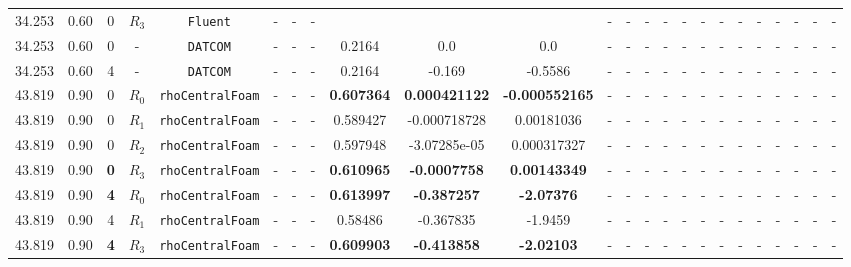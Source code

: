 \documentclass[12pt]{article}
\begin{document}
\begin{table}[H]
{\begin{tabular}{ccccc|ccc|ccc|ccc|ccc|ccccccc}
        \rowcolor{red!40}
        34.253 & 0.60 & 0 & $R_3$ & \texttt{Fluent} & - & - & - &  & &  & - & - & - & - & - & - & - & - & - & - & - & - & - \\ 
        \rowcolor{gray!10}
        34.253 & 0.60 & 0 & - & \texttt{DATCOM} & - & - & - & 0.2164 & 0.0 & 0.0 & - & - & - & - & - & - & - & - & - & - & - & - & - \\ 
        \rowcolor{gray!10}
        34.253 & 0.60 & 4 & - & \texttt{DATCOM} & - & - & - & 0.2164 & -0.169 & -0.5586 & - & - & - & - & - & - & - & - & - & - & - & - & - \\ \hline 
        \rowcolor{green!10}
        43.819 & 0.90 & 0 & $R_0$ & \texttt{rhoCentralFoam} & - & - & - & \textbf{0.607364} & \textbf{0.000421122} & \textbf{-0.000552165} & - & - & - & - & - & - & - & - & - & - & - & - & - \\ 
        \rowcolor{green!20}
        43.819 & 0.90 & 0 & $R_1$ & \texttt{rhoCentralFoam} & - & - & - & 0.589427 & -0.000718728 & 0.00181036 & - & - & - & - & - & - & - & - & - & - & - & - & - \\ 
        \rowcolor{green!30}
        43.819 & 0.90 & 0 & $R_2$ & \texttt{rhoCentralFoam} & - & - & - & 0.597948 & -3.07285e-05 & 0.000317327 & - & - & - & - & - & - & - & - & - & - & - & - & - \\ 
        \rowcolor{green!40}
        43.819 & 0.90 & \cellcolor{lime}\textbf{0} & \cellcolor{cyan}$R_3$ & \texttt{rhoCentralFoam} & - & - & - & \textbf{0.610965} & \textbf{-0.0007758} & \textbf{0.00143349} & - & - & - & - & - & - & - & - & - & - & - & - & - \\
        \rowcolor{green!10}
        43.819 & 0.90 & \textbf{4} & $R_0$ & \texttt{rhoCentralFoam} & - & - & - & \textbf{0.613997} & \textbf{-0.387257} & \textbf{-2.07376} & - & - & - & - & - & - & - & - & - & - & - & - & - \\
        \rowcolor{green!20}
        43.819 & 0.90 & 4 & $R_1$ & \texttt{rhoCentralFoam} & - & - & - & 0.58486 & -0.367835 & -1.9459 & - & - & - & - & - & - & - & - & - & - & - & - & - \\ 
        \rowcolor{green!40}
        43.819 & 0.90 & \cellcolor{lime}\textbf{4} & \cellcolor{cyan}$R_3$ & \texttt{rhoCentralFoam} & - & - & - & \textbf{0.609903} & \textbf{-0.413858} & \textbf{-2.02103} & - & - & - & - & - & - & - & - & - & - & - & - & - \\

\end{tabular}}
\end{table}
\end{document}
